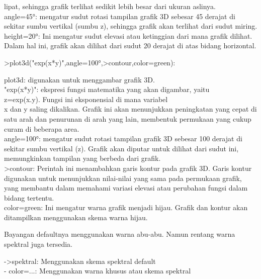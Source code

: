 \documentclass{article}
\begin{document}
\begin{eulernotebook}
\begin{eulercomment}
\begin{eulercomment}
\begin{eulercomment}
\begin{eulercomment}
\begin{eulercomment}
lipat, sehingga grafik terlihat sedikit lebih besar dari ukuran
aslinya.\\
angle=45°: mengatur sudut rotasi tampilan grafik 3D sebesar 45 derajat
di sekitar sumbu vertikal (sumbu z), sehingga grafik akan terlihat
dari sudut miring.\\
height=20°: Ini mengatur sudut elevasi atau ketinggian dari mana
grafik dilihat. Dalam hal ini, grafik akan dilihat dari sudut 20
derajat di atas bidang horizontal.
\end{eulercomment}
\begin{eulerprompt}
>plot3d("exp(x*y)",angle=100°,>contour,color=green):
\end{eulerprompt}
\begin{eulercomment}
plot3d: digunakan untuk menggambar grafik 3D.\\
"exp(x*y)": ekspresi fungsi matematika yang akan digambar, yaitu \\
z=exp(x.y). Fungsi ini eksponensial di mana variabel\\
x dan y saling dikalikan. Grafik ini akan menunjukkan peningkatan yang
cepat di satu arah dan penurunan di arah yang lain, membentuk
permukaan yang cukup curam di beberapa area.\\
angle=100°: mengatur sudut rotasi tampilan grafik 3D sebesar 100
derajat di sekitar sumbu vertikal (z). Grafik akan diputar untuk
dilihat dari sudut ini, memungkinkan tampilan yang berbeda dari
grafik.\\
\textgreater{}contour: Perintah ini menambahkan garis kontur pada grafik 3D. Garis
kontur digunakan untuk menunjukkan nilai-nilai yang sama pada
permukaan grafik, yang membantu dalam memahami variasi elevasi atau
perubahan fungsi dalam bidang tertentu.\\
color=green: Ini mengatur warna grafik menjadi hijau. Grafik dan
kontur akan ditampilkan menggunakan skema warna hijau.

Bayangan defaultnya menggunakan warna abu-abu. Namun rentang warna
spektral juga tersedia.

-\textgreater{}spektral: Menggunakan skema spektral default\\
- color=...: Menggunakan warna khusus atau skema spektral


\end{eulercomment}
\end{eulercomment}
\end{eulercomment}
\end{eulercomment}
\end{eulercomment}
\end{eulernotebook}
\end{document}
